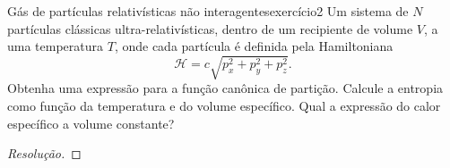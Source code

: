 \begin{exercício}{Gás de partículas relativísticas não interagentes}{exercício2}
    Um sistema de \(N\) partículas clássicas ultra-relativísticas, dentro de um recipiente de volume \(V\), a uma temperatura \(T\), onde cada partícula é definida pela Hamiltoniana
    \begin{equation*}
        \mathcal{H} = c\sqrt{p_x^2 + p_y^2 + p_z^2}.
    \end{equation*}
    Obtenha uma expressão para a função canônica de partição. Calcule a entropia como função da temperatura e do volume específico. Qual a expressão do calor específico a volume constante?
\end{exercício}
\begin{proof}[Resolução]

\end{proof}
